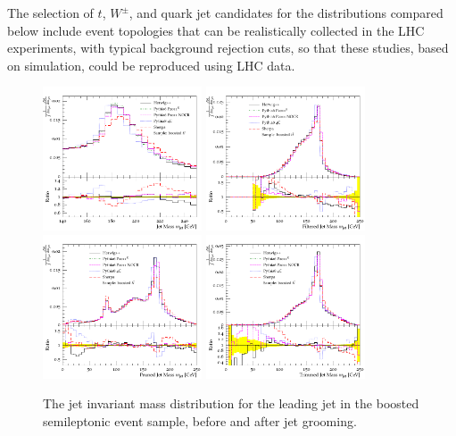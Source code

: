 The selection of $t$, $W^\pm$, and quark 
jet candidates for the distributions compared below include event 
topologies that can be realistically collected in the 
LHC experiments, with typical background rejection cuts, so that these studies, 
based on simulation, could be reproduced using LHC data.

\begin{figure}[t!]
  \centering 
   \includegraphics[width=0.42\textwidth]{MC_SUBSTRUCTURE_jetmass}
     \includegraphics[width=0.42\textwidth]{MC_SUBSTRUCTURE_Filtered_mass} \\
     \includegraphics[width=0.42\textwidth]{MC_SUBSTRUCTURE_Pruned_mass}
      \includegraphics[width=0.42\textwidth]{MC_SUBSTRUCTURE_Trimmed_mass}
    \caption[]{
The jet invariant mass distribution for the leading  jet in the boosted 
semileptonic \ttbar{} event sample, before and after jet grooming.}
  \label{fig:jmass}
\end{figure}

